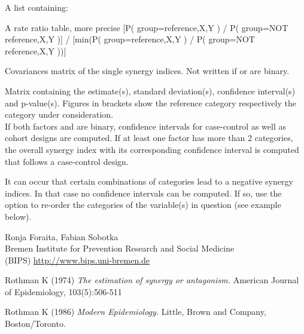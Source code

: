 \begin{Value}
A list containing:
\begin{ldescription}
\item[\code{ratio }] A rate ratio table, more precise [P( group=reference,X,Y ) / P( group=NOT reference,X,Y )] / [min(P( group=reference,X,Y ) / P( group=NOT reference,X,Y ))] 
\item[\code{covariance}] Covariances matrix of the single synergy indices. 
Not written if  or  are binary.
\item[\code{measure }] Matrix containing the estimate(s), standard deviation(s), 
confidence interval(s) and p-value(s). Figures in brackets show the
reference category respectively the category under consideration.\\                 
If both factors  and  are binary, confidence 
intervals for case-control as well as cohort designs are computed.
If at least one factor has more than 2 categories, the overall synergy index
with its corresponding confidence interval is computed that follows a 
case-control design.
\end{ldescription}
\end{Value}
\begin{Note}\relax
It can occur that certain combinations of categories lead to a negative synergy indices.
In that case no confidence intervals can be computed. If so, use the  option
to re-order the categories of the variable(s) in question (see example below).
\end{Note}
\begin{Author}\relax
Ronja Foraita, Fabian Sobotka \\
Bremen Institute for Prevention Research and Social Medicine \\
(BIPS)  \url{http://www.bips.uni-bremen.de}
\end{Author}
\begin{References}\relax
Rothman K (1974) 
\emph{The estimation of synergy or antagonism.}
American Journal of Epidemiology, 103(5):506-511

Rothman K (1986) 
\emph{Modern Epidemiology.}
Little, Brown and Company, Boston/Toronto.
\end{References}
\begin{SeeAlso}\relax
{}
\end{SeeAlso}

